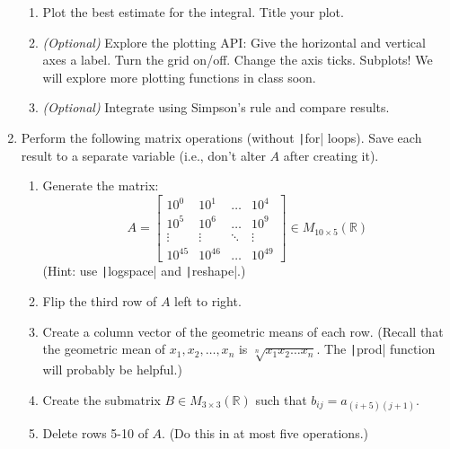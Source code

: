 \documentclass{article}
\begin{document}
\begin{enumerate}
\begin{enumerate}
  \item Plot the best estimate for the integral. Title your plot.
    
  \item \textit{(Optional)} Explore the plotting API: Give the horizontal and vertical axes a label. Turn the grid on/off. Change the axis ticks. Subplots! We will explore more plotting functions in class soon.
    
  \item \textit{(Optional)} Integrate using Simpson's rule and compare results.
  \end{enumerate}
  
  \clearpage
\item Perform the following matrix operations (without \texttt|for| loops). Save each result to a separate variable (i.e., don't alter $A$ after creating it).
  \begin{enumerate}
  \item Generate the matrix:
    \begin{equation*}
      A=\begin{bmatrix}
        10^{0} & 10^{1} & \dots & 10^{4} \\
        10^{5} & 10^6 & \dots & 10^9 \\
        \vdots & \vdots & \ddots & \vdots \\
        10^{45} & 10^{46} & \dots & 10^{49}
      \end{bmatrix}\in M_{10\times 5}(\mathbb{R})
    \end{equation*}
    (Hint: use \texttt|logspace| and \texttt|reshape|.)
    
  \item Flip the third row of $A$ left to right.
    
  \item Create a column vector of the geometric means of each row. (Recall that the geometric mean of $x_1,x_2,\dots,x_n$ is $\sqrt[n]{x_1x_2\dots x_n}$. The \texttt|prod| function will probably be helpful.)
    
  \item Create the submatrix $B\in M_{3\times 3}(\mathbb{R})$ such that $b_{ij}=a_{(i+5)(j+1)}$.
    
  \item Delete rows 5-10 of $A$. (Do this in at most five operations.)
  \end{enumerate}


\end{enumerate}
\end{document}
